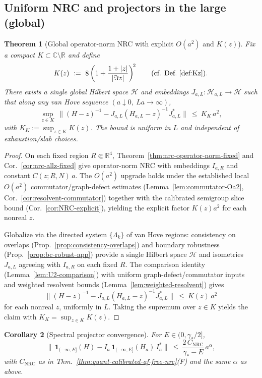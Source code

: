 \documentclass[11pt]{amsart}
\theoremstyle{plain}
\newtheorem{theorem}{Theorem}[section]
\newtheorem{corollary}[theorem]{Corollary}
\theoremstyle{definition}
\theoremstyle{remark}
\begin{document}
\subsection*{Uniform NRC and projectors in the large (global)}
\begin{theorem}[Global operator-norm NRC with explicit $O(a^2)$ and $K(z)$]\label{thm:nrc-global-Oa2}
Fix a compact $K\subset \mathbb C\setminus\mathbb R$ and define
\[
  K(z)\ :=\ 8\left(1+\frac{1+|z|}{|\Im z|}\right)^{\!2} \qquad (\text{cf. Def.~\ref{def:Kz}}).
\]
There exists a single global Hilbert space $\mathcal H$ and embeddings $J_{a,L}:\mathcal H_{a,L}\to \mathcal H$ such that along any van Hove sequence $(a\downarrow 0,\ La\to\infty)$,
\[
  \sup_{z\in K}\ \big\|(H-z)^{-1}-J_{a,L}(H_{a,L}-z)^{-1}J_{a,L}^*\big\|\ \le\ K_K\,a^2,
\]
with $K_K:=\sup_{z\in K}K(z)$. The bound is uniform in $L$ and independent of exhaustion/slab choices.
\end{theorem}
\begin{proof}
On each fixed region $R\Subset\mathbb R^4$, Theorem~\ref{thm:nrc-operator-norm-fixed} and Cor.~\ref{cor:nrc-allz-fixed} give operator-norm NRC with embeddings $I_{a,R}$ and constant $C(z;R,N)\,a$. The $O(a^2)$ upgrade holds under the established local $O(a^2)$ commutator/graph-defect estimates (Lemma~\ref{lem:commutator-Oa2}, Cor.~\ref{cor:resolvent-commutator}) together with the calibrated semigroup slice bound (Cor.~\ref{cor:NRC-explicit}), yielding the explicit factor $K(z) a^2$ for each nonreal $z$.

Globalize via the directed system $\{\Lambda_k\}$ of van Hove regions: consistency on overlaps (Prop.~\ref{prop:consistency-overlaps}) and boundary robustness (Prop.~\ref{prop:bc-robust-app}) provide a single Hilbert space $\mathcal H$ and isometries $J_{a,L}$ agreeing with $I_{a,R}$ on each fixed $R$. The comparison identity (Lemma~\ref{lem:U2-comparison}) with uniform graph-defect/commutator inputs and weighted resolvent bounds (Lemma~\ref{lem:weighted-resolvent}) gives
\[
  \big\|(H-z)^{-1}-J_{a,L}(H_{a,L}-z)^{-1}J_{a,L}^*\big\|\ \le\ K(z)\,a^2
\]
for each nonreal $z$, uniformly in $L$. Taking the supremum over $z\in K$ yields the claim with $K_K=\sup_{z\in K}K(z)$.
\end{proof}
\begin{corollary}[Spectral projector convergence]\label{cor:projector-global}
For $E\in(0,\gamma_*/2]$,
\[
\big\|\,\mathbf 1_{(-\infty,E]}(H)-I_a\,\mathbf 1_{(-\infty,E]}(H_a)\,I_a^*\big\|\ \le\ \frac{2\,C_{\mathrm{NRC}}}{\gamma_*-E}\,a^{\alpha},
\]
with $C_{\mathrm{NRC}}$ as in Thm.~\ref{thm:quant-calibrated-af-free-nrc}(F) and the same $\alpha$ as above.
\end{corollary}
\end{document}
